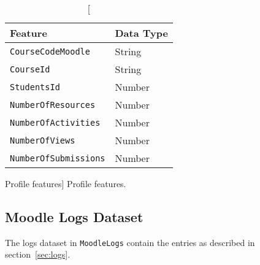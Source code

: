 \begin{table}[h!]
    \centering

    \begin{tabular}{l l}
        Feature                      & Data Type \\ \hline
        \texttt{CourseCodeMoodle}    & String    \\
        \texttt{CourseId}            & String    \\
        \texttt{StudentsId}          & Number    \\
        \texttt{NumberOfResources}   & Number    \\
        \texttt{NumberOfActivities}  & Number    \\
        \texttt{NumberOfViews}       & Number    \\
        \texttt{NumberOfSubmissions} & Number    \\
    \end{tabular}

    \caption
        [Profile features]
        {Profile features.}

    \label{tab:profile_features}
\end{table}

\subsection{Moodle Logs Dataset}

The logs dataset in \texttt{MoodleLogs} contain the entries as described in
section~\ref{sec:logs}.
